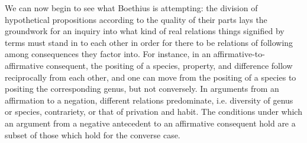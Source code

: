 \documentclass[a4paper, 11pt]{article}
\begin{document}
We can now begin to see what Boethius is attempting: the division of hypothetical propositions according to the quality of their parts lays the groundwork for an inquiry into what kind of real relations things signified by terms must stand in to each other in order for there to be relations of following among consequences they factor into. For instance, in an affirmative-to-affirmative consequent, the positing of a species, property, and difference follow reciprocally from each other, and one can move from the positing of a species to positing the corresponding genus, but not conversely. In arguments from an affirmation to a negation, different relations predominate, i.e.  diversity of genus or species, contrariety, or that of privation and habit. The conditions under which an argument from a negative antecedent to an affirmative consequent hold are a subset of those which hold for the converse case.
\end{document}
